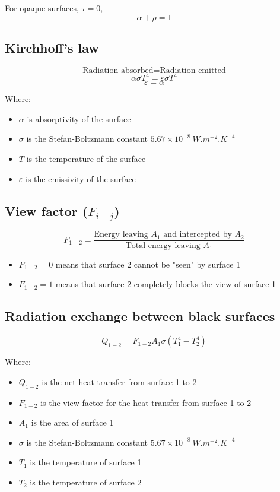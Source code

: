 \documentclass[11pt]{article}
\begin{document}
For opaque surfaces, \(\tau = 0\),
\[\alpha + \rho = 1\]

\subsection{Kirchhoff's law}
\label{sec:org29d5c76}
\[\text{Radiation absorbed} = \text{Radiation emitted}\]
\[\alpha \sigma T^4 = \varepsilon \sigma T^4\]
\[\varepsilon = \alpha\]

Where:
\begin{itemize}
\item \(\alpha\) is absorptivity of the surface
\item \(\sigma\) is the Stefan-Boltzmann constant \(5.67 \times 10^{-8} \ \unit{W.m^{-2}.K^{-4}}\)
\item \(T\) is the temperature of the surface
\item \(\varepsilon\) is the emissivity of the surface
\end{itemize}

\subsection{View factor (\(F_{i-j}\))}
\label{sec:org0461366}
\[F_{1-2} = \frac{\text{Energy leaving $A_1$ and intercepted by $A_2$}}{\text{Total energy leaving $A_1$}}\]

\begin{itemize}
\item \(F_{1-2} = 0\) means that surface 2 cannot be "seen" by surface 1
\item \(F_{1-2} = 1\) means that surface 2 completely blocks the view of surface 1
\end{itemize}

 \newpage

\subsection{Radiation exchange between black surfaces}
\label{sec:orgffd1ac7}
\[Q_{1-2} = F_{1-2} A_1 \sigma \left(T_1^4 - T_2^4 \right)\]

Where:
\begin{itemize}
\item \(Q_{1-2}\) is the net heat transfer from surface 1 to 2
\item \(F_{1-2}\) is the view factor for the heat transfer from surface 1 to 2
\item \(A_1\) is the area of surface 1
\item \(\sigma\) is the Stefan-Boltzmann constant \(5.67 \times 10^{-8} \ \unit{W.m^{-2}.K^{-4}}\)
\item \(T_1\) is the temperature of surface 1
\item \(T_2\) is the temperature of surface 2
\end{itemize}
\end{document}
